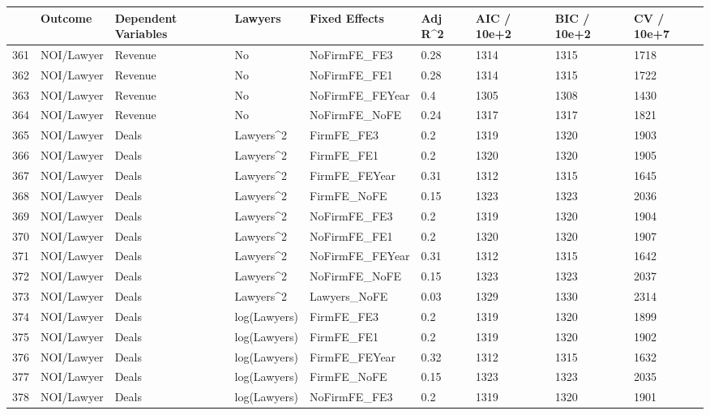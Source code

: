 \begin{table}[ht]
\centering
\begin{tabular}{rllllllll}
  \hline
 & Outcome & Dependent Variables & Lawyers & Fixed Effects & Adj R^2 & AIC / 10e+2 & BIC / 10e+2 & CV / 10e+7 \\ 
  \hline
361 & NOI/Lawyer & Revenue & No & NoFirmFE\_FE3 & 0.28 & 1314 & 1315 & 1718 \\ 
  362 & NOI/Lawyer & Revenue & No & NoFirmFE\_FE1 & 0.28 & 1314 & 1315 & 1722 \\ 
  363 & NOI/Lawyer & Revenue & No & NoFirmFE\_FEYear & 0.4 & 1305 & 1308 & 1430 \\ 
  364 & NOI/Lawyer & Revenue & No & NoFirmFE\_NoFE & 0.24 & 1317 & 1317 & 1821 \\ 
  365 & NOI/Lawyer & Deals & Lawyers^2 & FirmFE\_FE3 & 0.2 & 1319 & 1320 & 1903 \\ 
  366 & NOI/Lawyer & Deals & Lawyers^2 & FirmFE\_FE1 & 0.2 & 1320 & 1320 & 1905 \\ 
  367 & NOI/Lawyer & Deals & Lawyers^2 & FirmFE\_FEYear & 0.31 & 1312 & 1315 & 1645 \\ 
  368 & NOI/Lawyer & Deals & Lawyers^2 & FirmFE\_NoFE & 0.15 & 1323 & 1323 & 2036 \\ 
  369 & NOI/Lawyer & Deals & Lawyers^2 & NoFirmFE\_FE3 & 0.2 & 1319 & 1320 & 1904 \\ 
  370 & NOI/Lawyer & Deals & Lawyers^2 & NoFirmFE\_FE1 & 0.2 & 1320 & 1320 & 1907 \\ 
  371 & NOI/Lawyer & Deals & Lawyers^2 & NoFirmFE\_FEYear & 0.31 & 1312 & 1315 & 1642 \\ 
  372 & NOI/Lawyer & Deals & Lawyers^2 & NoFirmFE\_NoFE & 0.15 & 1323 & 1323 & 2037 \\ 
  373 & NOI/Lawyer & Deals & Lawyers^2 & Lawyers\_NoFE & 0.03 & 1329 & 1330 & 2314 \\ 
  374 & NOI/Lawyer & Deals & log(Lawyers) & FirmFE\_FE3 & 0.2 & 1319 & 1320 & 1899 \\ 
  375 & NOI/Lawyer & Deals & log(Lawyers) & FirmFE\_FE1 & 0.2 & 1319 & 1320 & 1902 \\ 
  376 & NOI/Lawyer & Deals & log(Lawyers) & FirmFE\_FEYear & 0.32 & 1312 & 1315 & 1632 \\ 
  377 & NOI/Lawyer & Deals & log(Lawyers) & FirmFE\_NoFE & 0.15 & 1323 & 1323 & 2035 \\ 
  378 & NOI/Lawyer & Deals & log(Lawyers) & NoFirmFE\_FE3 & 0.2 & 1319 & 1320 & 1901 \\ 

\end{tabular}
\end{table}
